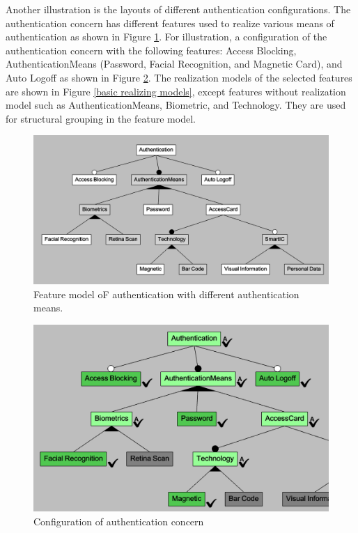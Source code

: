 Another illustration is the layouts of different authentication configurations. The authentication concern has different features used to realize various means of authentication as shown in Figure \ref{authenticationExampl}.  For illustration, a configuration of the authentication concern with the following features: Access Blocking, AuthenticationMeans (Password, Facial Recognition, and Magnetic Card), and Auto Logoff as shown in Figure \ref{authentication configuration}. The realization models of the selected features are shown in Figure \ref{basic realizing models}, except features without realization model such as AuthenticationMeans, Biometric, and Technology. They are used for structural grouping in the feature model.

\begin{figure}
	\centering
    \includegraphics[width=1\linewidth]{authenticationConcern.PNG}
	\caption{Feature model oF authentication with different authentication means.}
    \label{authenticationExampl}
\end{figure}
\begin{figure}
	\centering
    \includegraphics[width=1\linewidth]{biopasswordcardfm.PNG}
	\caption{Configuration of authentication concern}
    \label{authentication configuration}
\end{figure}

